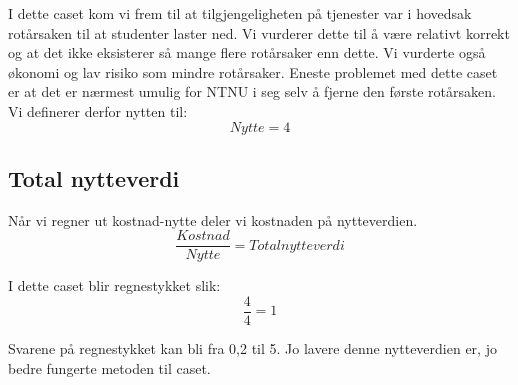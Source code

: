 I dette caset kom vi frem til at tilgjengeligheten på tjenester var i hovedsak rotårsaken til at studenter laster ned. Vi vurderer dette til å være relativt korrekt og at det ikke eksisterer så mange flere rotårsaker enn dette. Vi vurderte også økonomi og lav risiko som mindre rotårsaker. Eneste problemet med dette caset er at det er nærmest umulig for NTNU i seg selv å fjerne den første rotårsaken. Vi definerer derfor nytten til:
\[Nytte = 4\]

\subsection{Total nytteverdi}
Når vi regner ut kostnad-nytte deler vi kostnaden på nytteverdien. 
\[\frac{Kostnad}{Nytte} = Total nytteverdi\]

I dette caset blir regnestykket slik:
\[\frac{4}{4} = 1\]

Svarene på regnestykket kan bli fra 0,2 til 5. Jo lavere denne nytteverdien er, jo bedre fungerte metoden til caset. 